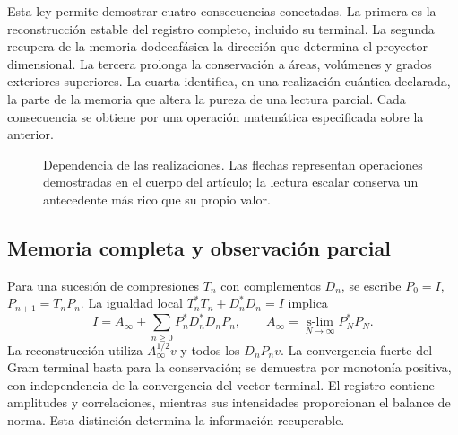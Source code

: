 Esta ley permite demostrar cuatro consecuencias conectadas. La primera es la reconstrucción estable del registro completo, incluido su terminal. La segunda recupera de la memoria dodecafásica la dirección que determina el proyector dimensional. La tercera prolonga la conservación a áreas, volúmenes y grados exteriores superiores. La cuarta identifica, en una realización cuántica declarada, la parte de la memoria que altera la pureza de una lectura parcial. Cada consecuencia se obtiene por una operación matemática especificada sobre la anterior.

\begin{figure}[htbp]
\centering
{}
\caption{Dependencia de las realizaciones. Las flechas representan operaciones demostradas en el cuerpo del artículo; la lectura escalar conserva un antecedente más rico que su propio valor.}
\end{figure}

\subsection{Memoria completa y observación parcial}
Para una sucesión de compresiones \(T_n\) con complementos \(D_n\), se escribe
\(P_0=I\), \(P_{n+1}=T_nP_n\). La igualdad local
\(T_n^*T_n+D_n^*D_n=I\) implica
\[
I=A_\infty+\sum_{n\ge0}P_n^*D_n^*D_nP_n,
\qquad
A_\infty=\underset{N\to\infty}{\operatorname{s-lim}}P_N^*P_N.
\]
La reconstrucción utiliza \(A_\infty^{1/2}v\) y todos los \(D_nP_nv\). La convergencia fuerte del Gram terminal basta para la conservación; se demuestra por monotonía positiva, con independencia de la convergencia del vector terminal. El registro contiene amplitudes y correlaciones, mientras sus intensidades proporcionan el balance de norma. Esta distinción determina la información recuperable.

